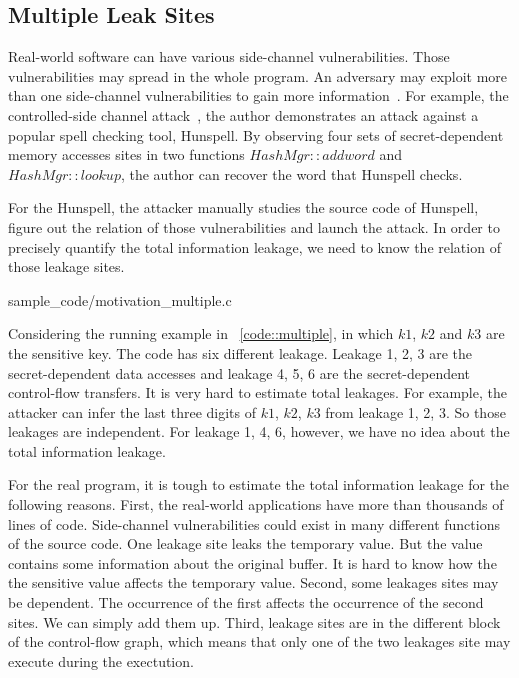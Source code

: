 \subsection{Multiple Leak Sites}
Real-world software can have various side-channel vulnerabilities. Those vulnerabilities 
may spread in the whole program. An adversary may exploit more than one side-channel vulnerabilities 
to gain more information~\cite{7163052, 191010}. For example, the controlled-side channel attack~\cite{7163052}, the author 
demonstrates an attack against a popular spell checking tool, Hunspell. By observing four sets 
of secret-dependent memory accesses sites in two functions $HashMgr::addword$ and $HashMgr::lookup$, 
the author can recover the word that Hunspell checks.

For the Hunspell, the attacker manually studies the source code of Hunspell, figure out
the relation of those vulnerabilities and launch the attack. In order to precisely quantify the
total information leakage, we need to know the relation of those leakage sites. 


                 {sample_code/motivation_multiple.c}

Considering the running example in ~\ref{code::multiple}, in which $k1$, $k2$ and $k3$ are
the sensitive key. The code has six different leakage. Leakage 1, 2, 3 are the secret-dependent
data accesses and leakage 4, 5, 6 are the secret-dependent control-flow transfers. It is
very hard to estimate total leakages. For example, the attacker can infer the last three digits of
$k1$, $k2$, $k3$ from leakage 1, 2, 3. So those leakages are independent. For leakage 1, 4, 6, however,
we have no idea about the total information leakage.

For the real program, it is tough to estimate the total information leakage for the following reasons.
First, the real-world applications have more than thousands of lines of code. Side-channel vulnerabilities
could exist in many different functions of the source code. One leakage site leaks the temporary value. 
But the value contains some information about the original buffer. It is hard to know how the 
the sensitive value affects the temporary value. Second, some leakages sites may be
dependent. The occurrence of the first affects the occurrence of the second sites. We 
can simply add them up. Third, leakage sites are in the different block of the 
control-flow graph, which means that only one of the two leakages site may execute
during the exectution.

